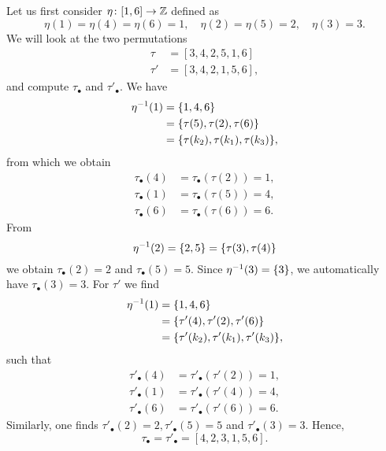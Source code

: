 \begin{example}
	Let us first consider $\eta \colon [1, 6] \to \mathbb{Z}$ defined as
	\begin{equation*}
		\eta(1) = \eta(4) = \eta(6) = 1, \quad \eta(2) = \eta(5) = 2, \quad \eta(3) = 3.
	\end{equation*}
	We will look at the two permutations
	\begin{align*}
		\tau  & = [3,4,2,5,1,6]  \\
		\tau' & = [3,4,2,1,5,6],
	\end{align*}
	and compute $\tau_\bullet$ and $\tau'_\bullet$. We have
	\begin{align*}
		\eta^{-1}(1) & = \{1, 4, 6\}                          \\
		            & = \{\tau(5), \tau(2), \tau(6)\}        \\
		            & = \{\tau(k_2), \tau(k_1), \tau(k_3)\},
	\end{align*}
	from which we obtain
	\begin{align*}
		\tau_\bullet(4) & = \tau_\bullet(\tau(2)) = 1, \\
		\tau_\bullet(1) & = \tau_\bullet(\tau(5)) = 4, \\
		\tau_\bullet(6) & = \tau_\bullet(\tau(6)) = 6.
	\end{align*}
	From
	\begin{equation*}
		\eta^{-1}(2) = \{2, 5\} = \{\tau(3), \tau(4)\}
	\end{equation*}
	we obtain $\tau_\bullet(2) = 2$ and $\tau_\bullet(5) = 5$. Since $\eta^{-1}(3) = \{3\}$,
	we automatically have $\tau_\bullet(3) = 3$. For $\tau'$ we find
	\begin{align*}
		\eta^{-1}(1) & = \{1, 4, 6\}                             \\
		            & = \{\tau'(4), \tau'(2), \tau'(6)\}        \\
		            & = \{\tau'(k_2), \tau'(k_1), \tau'(k_3)\},
	\end{align*}
	such that
	\begin{align*}
		\tau'_\bullet(4) & = \tau'_\bullet(\tau'(2)) = 1, \\
		\tau'_\bullet(1) & = \tau'_\bullet(\tau'(4)) = 4, \\
		\tau'_\bullet(6) & = \tau'_\bullet(\tau'(6)) = 6.
	\end{align*}
	Similarly, one finds $\tau'_\bullet(2) = 2, \tau'_\bullet(5) = 5$ and $\tau'_\bullet(3)
		= 3$. Hence,
	\begin{equation*}
		\tau_\bullet = \tau'_\bullet = [4,2,3,1,5,6].
	\end{equation*}


\end{example}
